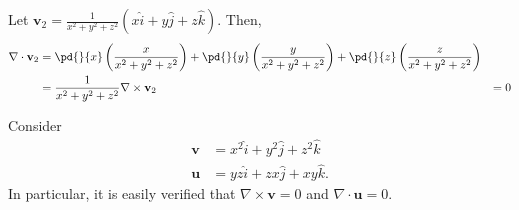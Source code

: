 \documentclass[10pt]{mypackage}
\begin{document}
\begin{example}
  Let $\mathbf{v}_2 = \frac{1}{x^2 + y^2 + z^2}\left(x\hat{i} + y\hat{j} + z\hat{k}\right)$. Then,
  \begin{align*}
    \nabla \cdot \mathbf{v}_2 &= \pd{}{x}\left(\frac{x}{x^2 + y^2 + z^2}\right) + \pd{}{y}\left(\frac{y}{x^2 + y^2 + z^2}\right) + \pd{}{z}\left(\frac{z}{x^2 + y^2 + z^2}\right)\\
                              &= \frac{1}{x^2 + y^2 + z^2}
    \nabla \times \mathbf{v}_2 &= 0
  \end{align*}
\end{example}
\begin{example}
  Consider
  \begin{align*}
    \mathbf{v} &= x^2 \hat{i} + y^2 \hat{j} + z^2\hat{k}\\
    \mathbf{u} &= yz\hat{i} + zx\hat{j} + xy\hat{k}.
  \end{align*}
  In particular, it is easily verified that $\nabla \times \mathbf{v} = 0$ and $\nabla \cdot \mathbf{u} = 0$.
\end{example}
\end{document}
